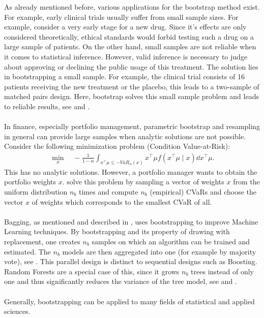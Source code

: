 As already mentioned before, various applications for the bootstrap method exist. For example, early clinical trials usually suffer from small sample sizes. For example, consider a very early stage for a new drug. Since it's effects are only considered theoretically, ethical standards would forbid testing such a drug on a large sample of patients. On the other hand, small samples are not reliable when it comes to statistical inference. However, valid inference is necessary to judge about approving or declining the public usage of this treatment. The solution lies in bootstrapping a small sample. For example, the clinical trial consists of 16 patients receiving the new treatment or the placebo, this leads to a two-sample of matched pairs design. Here, bootstrap solves this small sample problem and leads to reliable results, see \citet{boot4} and \citet{boot2}.\\
\\
\noindent In finance, especially portfolio management, parametric bootstrap and resampling in general can provide large samples when analytic solutions are not possible. Consider the following minimization problem (Condition Value-at-Risk):
\begin{align}
	\min_{x} \quad - \frac{1}{1 - \alpha}\int_{x^{\intercal}\mu \leq -VaR_{\alpha}(x)} x^{\intercal}\mu f\left(x^{\intercal}\mu \mid x\right)\dd x^{\intercal}\mu.
\end{align}
This has no analytic solutions. However, a portfolio manager wants to obtain the portfolio weights $x$. \citet{erin} solve this problem by sampling a vector of weights $x$ from the uniform distribution $n_{b}$ times and compute $n_{b}$ (empirical) CVaRs and choose the vector $x$ of weights which corresponds to the smallest CVaR of all.\\
\\
\noindent Bagging, as mentioned and described in \citet{stat1}, uses bootstrapping to improve Machine Learning techniques. By bootstrapping and its property of drawing with replacement, one creates $n_b$ samples on which an algorithm can be trained and estimated. The $n_b$ models are then aggregated into one (for example by majority vote), see \citet{rf2}. This parallel design is distinct to sequential designs such as Boosting. Random Forests are a special case of this, since it grows $n_b$ trees instead of only one and thus significantly reduces the variance of the tree model, see \citet{rf1} and \citet{rf3}.\\
\\
\noindent Generally, bootstrapping can be applied to many fields of statistical and applied sciences. 